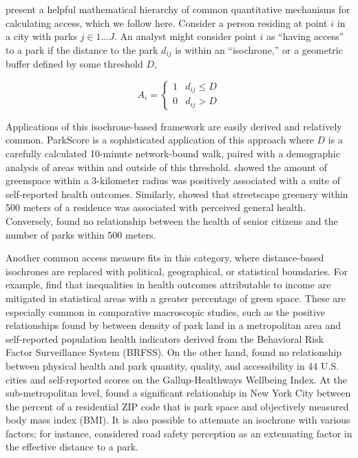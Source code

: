 \documentclass[shortAfour,sageh.bst]{sagej}
\begin{document}
\citet{Dong2006} present a helpful mathematical hierarchy of common
quantitative mechanisms for calculating access, which we follow here.
Consider a person residing at point \(i\) in a city with parks
\(j \in 1 \ldots J\). An analyst might consider point \(i\) as ``having
access'' to a park if the distance to the park \(d_{ij}\) is within an
``isochrone,'' or a geometric buffer defined by some threshold \(D\),

\begin{equation}\label{eq:isochrone}
A_i = \begin{cases} 
      1 & d_{ij}\leq D\\
      0 & d_{ij} > D
   \end{cases}
\end{equation}

Applications of this isochrone-based framework are easily derived and
relatively common. ParkScore \citep{parkscore2019} is a sophisticated
application of this approach where \(D\) is a carefully calculated
10-minute network-bound walk, paired with a demographic analysis of
areas within and outside of this threshold. \citet{devries2003natural}
showed the amount of greenspace within a 3-kilometer radius was
positively associated with a suite of self-reported health outcomes.
Similarly, \citet{devries2013streetscape} showed that streetscape
greenery within 500 meters of a residence was associated with perceived
general health. Conversely, \citet{carlson2012interactions} found no
relationship between the health of senior citizens and the number of
parks within 500 meters.

Another common access measure fits in this category, where
distance-based isochrones are replaced with political, geographical, or
statistical boundaries. For example, \citet{Mitchell2008} find that
inequalities in health outcomes attributable to income are mitigated in
statistical areas with a greater percentage of green space. These are
especially common in comparative macroscopic studies, such as the
positive relationships found by \citet{West2012} between density of park
land in a metropolitan area and self-reported population health
indicators derived from the Behavioral Risk Factor Surveillance System
(BRFSS). On the other hand, \citet{Larson2016} found no relationship
between physical health and park quantity, quality, and accessibility in
44 U.S. cities and self-reported scores on the Gallup-Healthways
Wellbeing Index. At the sub-metropolitan level, \citet{Stark2014} found
a significant relationship in New York City between the percent of a
residential ZIP code that is park space and objectively measured body
mass index (BMI). It is also possible to attenuate an isochrone with
various factors; for instance, \citet{Dias2019} considered road safety
perception as an extenuating factor in the effective distance to a park.
\end{document}
